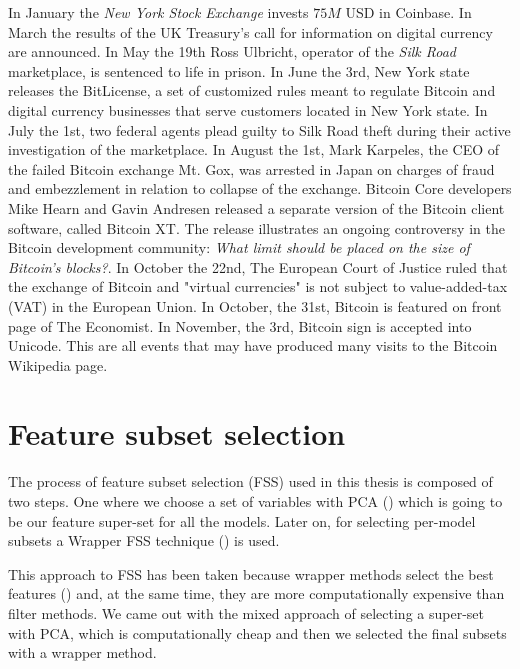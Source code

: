 In January the \textit{New York Stock Exchange} invests $75M$ USD in
Coinbase. In March the results of the UK Treasury's call for
information on digital currency are announced. In May the 19th Ross
Ulbricht, operator of the \textit{Silk Road} marketplace, is sentenced
to life in prison. In June the 3rd, New York state releases the
BitLicense, a set of customized rules meant to regulate Bitcoin and
digital currency businesses that serve customers located in New York
state. In July the 1st, two federal agents plead guilty to Silk Road
theft during their active investigation of the marketplace. In August
the 1st, Mark Karpeles, the CEO of the failed Bitcoin exchange Mt.
Gox, was arrested in Japan on charges of fraud and embezzlement in
relation to collapse of the exchange. Bitcoin Core developers Mike
Hearn and Gavin Andresen released a separate version of the Bitcoin
client software, called Bitcoin XT. The release illustrates an ongoing
controversy in the Bitcoin development community: \textit{What limit
  should be placed on the size of Bitcoin's blocks?}. In October the
22nd, The European Court of Justice ruled that the exchange of Bitcoin
and "virtual currencies" is not subject to value-added-tax (VAT) in
the European Union. In October, the 31st, Bitcoin is featured on front
page of The Economist. In November, the 3rd, Bitcoin sign is accepted
into Unicode. This are all events that may have produced many visits
to the Bitcoin Wikipedia page.


\chapter{Feature subset selection}
\label{ch:feature-selection}

The process of feature subset selection (FSS) used in this thesis is
composed of two steps. One where we choose a set of variables with PCA
(\cite{pearson1901liii}) which is going to be our feature super-set
for all the models. Later on, for selecting per-model subsets a
Wrapper FSS technique (\cite{kohavi1997wrappers}) is used.

This approach to FSS has been taken because wrapper methods select the
best features (\cite{inza2004filter, kumari2011filter}) and, at the
same time, they are more computationally expensive than filter
methods. We came out with the mixed approach of selecting a super-set
with PCA, which is computationally cheap and then we selected the
final subsets with a wrapper method.

